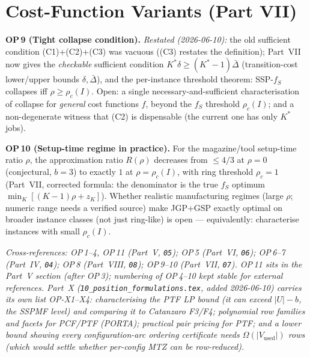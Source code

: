 \documentclass[11pt,a4paper]{article}
\newcommand{\Kstar}{K^{*}}
\begin{document}
\section{Cost-Function Variants (Part VII)}
\begin{op}
\textbf{OP\,9 (Tight collapse condition).}
\emph{Restated (2026-06-10):} the old sufficient condition (C1)+(C2)+(C3) was
vacuous ((C3) restates the definition); Part~VII now gives the \emph{checkable}
sufficient condition $\Kstar\delta\ge(\Kstar-1)\bar\Delta$ (transition-cost
lower/upper bounds $\delta,\bar\Delta$), and the per-instance threshold theorem:
SSP-$f_S$ collapses iff $\rho\ge\rho_c(I)$. Open: a single
necessary-and-sufficient characterisation of collapse for \emph{general} cost
functions $f$, beyond the $f_S$ threshold $\rho_c(I)$; and a non-degenerate
witness that (C2) is dispensable (the current one has only $\Kstar$ jobs).
\end{op}
\begin{op}
\textbf{OP\,10 (Setup-time regime in practice).} For the magazine/tool setup-time ratio
$\rho$, the approximation ratio $R(\rho)$ decreases from $\le 4/3$ at $\rho=0$
(conjectural, $b=3$) to exactly $1$ at $\rho=\rho_c(I)$, with ring threshold
$\rho_c=1$ (Part~VII, corrected formula: the denominator is the true $f_S$
optimum $\min_K[(K-1)\rho+z_K]$).
Whether realistic manufacturing regimes (large $\rho$; numeric range needs a
verified source) make JGP+GSP exactly optimal on broader instance
classes (not just ring-like) is open --- equivalently: characterise instances
with small $\rho_c(I)$.
\end{op}
\vspace{0.4cm}
\noindent\textit{Cross-references: OP\,1--4, OP\,11 (Part~V, \texttt{05}); OP\,5 (Part~VI,
\texttt{06}); OP\,6--7 (Part~IV, \texttt{04}); OP\,8 (Part~VIII, \texttt{08}); OP\,9--10
(Part~VII, \texttt{07}). OP\,11 sits in the Part~V section (after OP\,3); numbering of
OP\,4--10 kept stable for external references. Part~X
(\texttt{10\_position\_formulations.tex}, added 2026-06-10) carries its own list
OP-X1--X4: characterising the PTF LP bound (it can exceed $|U|-b$, the SSPMF
level) and comparing it to Catanzaro F3/F4; polynomial row families and facets
for PCF/PTF (PORTA); practical pair pricing for PTF; and a lower bound showing
every configuration-arc ordering certificate needs $\Omega(|V_{\mathrm{used}}|)$
rows (which would settle whether per-config MTZ can be row-reduced).}
\end{document}
